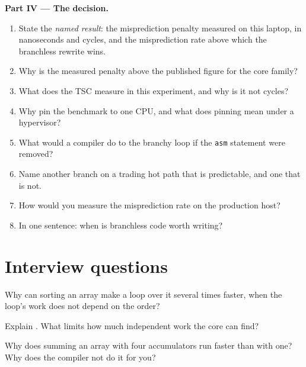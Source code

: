 \begin{problem}
\medskip\noindent\textbf{Part IV --- The decision.}
\begin{enumerate}[resume]
\item State the \emph{named result}: the misprediction penalty measured on this laptop, in nanoseconds and cycles, and the
misprediction rate above which the branchless rewrite wins.
\item Why is the measured penalty above the published figure for the core family?
\item What does the TSC measure in this experiment, and why is it not cycles?
\item Why pin the benchmark to one CPU, and what does pinning mean under a hypervisor?
\item What would a compiler do to the branchy loop if the \texttt{asm} statement were removed?
\item Name another branch on a trading hot path that is predictable, and one that is not.
\item How would you measure the misprediction rate on the production host?
\item In one sentence: when is branchless code worth writing?
\end{enumerate}
\end{problem}

\section{Interview questions}

\begin{interviewq}\label{iq:ll:cpu-microarchitecture:1}
Why can sorting an array make a loop over it several times faster, when the loop's work does not depend on the order?
\end{interviewq}

\begin{interviewq}\label{iq:ll:cpu-microarchitecture:2}
Explain . What limits how much independent work the core can find?
\end{interviewq}

\begin{interviewq}\label{iq:ll:cpu-microarchitecture:3}
Why does summing an array with four accumulators run faster than with one? Why does the compiler not do it for you?
\end{interviewq}

